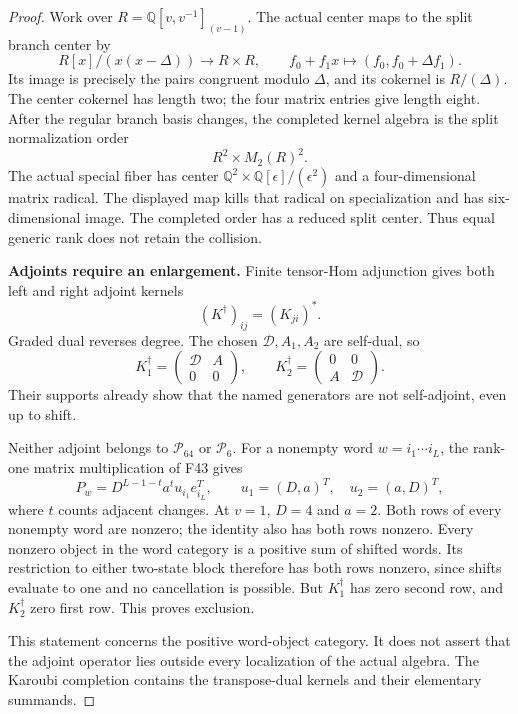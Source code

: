 \documentclass[11pt,a4paper]{article}
\newcommand{\A}{\mathbb A}\newcommand{\PP}{\mathbb P}\newcommand{\GL}{\mathrm{GL}}
\newcommand{\fid}[1]{\textsf{#1}}\newcommand{\gate}[1]{\textsf{#1}}
\theoremstyle{named}\newtheorem{finding}{Finding}[section]
\theoremstyle{definition}\newtheorem{definition}[finding]{Definition}
\theoremstyle{remark}\newtheorem{remark}[finding]{Remark}
\begin{document}
\begin{proof}
Work over $R=\mathbb Q[v,v^{-1}]_{(v-1)}$.
The actual center maps to the split branch center by
\[
 R[x]/(x(x-\Delta))\longrightarrow R\times R,\qquad
 f_0+f_1x\longmapsto(f_0,f_0+\Delta f_1).
\]
Its image is precisely the pairs congruent modulo
$\Delta$, and its cokernel is $R/(\Delta)$.
The center cokernel has length two; the four matrix
entries give length eight.
After the regular branch basis changes, the completed
kernel algebra is the split normalization order
\[
 R^2\times M_2(R)^2.
\]
The actual special fiber has center
$\mathbb Q^2\times\mathbb Q[\epsilon]/(\epsilon^2)$
and a four-dimensional matrix radical.
The displayed map kills that radical on specialization
and has six-dimensional image.
The completed order has a reduced split center.
Thus equal generic rank does not retain the collision.

\par\smallskip\noindent\textbf{Adjoints require an enlargement.}\quad
Finite tensor-Hom adjunction gives both left and right
adjoint kernels
\[
 (K^\dagger)_{ij}=(K_{ji})^*.
\]
Graded dual reverses degree.
The chosen $\mathcal D,A_1,A_2$ are self-dual, so
\[
 K_1^\dagger=\begin{pmatrix}\mathcal D&A\\0&0\end{pmatrix},
 \qquad
 K_2^\dagger=\begin{pmatrix}0&0\\A&\mathcal D\end{pmatrix}.
\]
Their supports already show that the named generators
are not self-adjoint, even up to shift.

Neither adjoint belongs to $\mathcal P_{64}$ or
$\mathcal P_6$.
For a nonempty word $w=i_1\cdots i_L$, the rank-one
matrix multiplication of \fid{F43} gives
\[
 P_w=D^{L-1-t}a^t u_{i_1}e_{i_L}^{T},\qquad
 u_1=(D,a)^T,\quad u_2=(a,D)^T,
\]
where $t$ counts adjacent changes.
At $v=1$, $D=4$ and $a=2$.
Both rows of every nonempty word are nonzero; the
identity also has both rows nonzero.
Every nonzero object in the word category is a
positive sum of shifted words.
Its restriction to either two-state block therefore
has both rows nonzero, since shifts evaluate to one
and no cancellation is possible.
But $K_1^\dagger$ has zero second row, and
$K_2^\dagger$ zero first row.
This proves exclusion.

This statement concerns the positive word-object
category. It does not assert that the adjoint operator
lies outside every localization of the actual algebra.
The Karoubi completion contains the transpose-dual
kernels and their elementary summands.


\end{proof}
\end{document}
